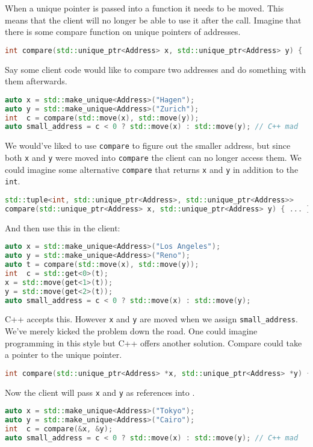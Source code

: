 \documentclass{article}
\begin{document}
\begin{example}
  When a unique pointer is passed into a function it needs to be moved.
  This means that the client will no longer be able to use it after the call.
  Imagine that there is some compare function on unique pointers of addresses.
\begin{lstlisting}[language=C++]
int compare(std::unique_ptr<Address> x, std::unique_ptr<Address> y) { ... }
\end{lstlisting}
  Say some client code would like to compare two addresses and do something with them afterwards.
\begin{lstlisting}[language=C++]
auto x = std::make_unique<Address>("Hagen");
auto y = std::make_unique<Address>("Zurich");
int  c = compare(std::move(x), std::move(y));
auto small_address = c < 0 ? std::move(x) : std::move(y); // C++ mad
\end{lstlisting}
  We would've liked to use \texttt{compare} to figure out the smaller address, but since both \texttt{x} and \texttt{y} were moved into \texttt{compare} the client can no longer access them.
  We could imagine some alternative \texttt{compare} that returns \texttt{x} and \texttt{y} in addition to the \texttt{int}.
\begin{lstlisting}[language=C++]
std::tuple<int, std::unique_ptr<Address>, std::unique_ptr<Address>>
compare(std::unique_ptr<Address> x, std::unique_ptr<Address> y) { ... }
\end{lstlisting}
  And then use this in the client:
\begin{lstlisting}[language=C++]
auto x = std::make_unique<Address>("Los Angeles");
auto y = std::make_unique<Address>("Reno");
auto t = compare(std::move(x), std::move(y));
int  c = std::get<0>(t);
x = std::move(get<1>(t));
y = std::move(get<2>(t));
auto small_address = c < 0 ? std::move(x) : std::move(y);
\end{lstlisting}
  C++ accepts this.
  However \texttt{x} and \texttt{y} are moved when we assign \texttt{small\_address}.
  We've merely kicked the problem down the road.
  One could imagine programming in this style but C++ offers another solution.
  Compare could take a pointer to the unique pointer.
  \begin{lstlisting}[language=C++]
int compare(std::unique_ptr<Address> *x, std::unique_ptr<Address> *y) { ... }
\end{lstlisting}
  Now the client will pass \texttt{x} and \texttt{y} as references into .
\begin{lstlisting}[language=C++]
auto x = std::make_unique<Address>("Tokyo");
auto y = std::make_unique<Address>("Cairo");
int  c = compare(&x, &y);
auto small_address = c < 0 ? std::move(x) : std::move(y); // C++ mad
\end{lstlisting}
\end{example}
\end{document}

